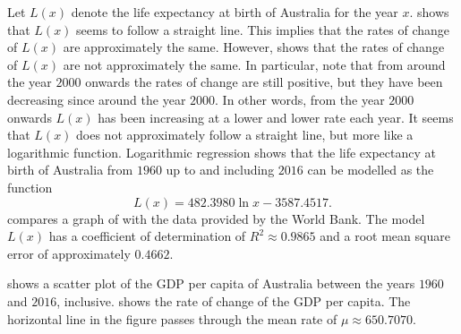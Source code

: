\documentclass[a4paper,oneside,12pt]{article}
\begin{document}
\begin{problem}
{\begin{solution}
Let $L(x)$ denote the life expectancy at birth of Australia for the
year $x$.   shows that
$L(x)$ seems to follow a straight line.  This implies that the rates
of change of $L(x)$ are approximately the same.  However,
 shows
that the rates of change of $L(x)$ are not approximately the same.  In
particular, note that from around the year $2000$ onwards the rates of
change are still positive, but they have been decreasing since around
the year $2000$.  In other words, from the year $2000$ onwards $L(x)$
has been increasing at a lower and lower rate each year.  It seems
that $L(x)$ does not approximately follow a straight line, but more
like a logarithmic function.  Logarithmic regression shows that the
life expectancy at birth of Australia from $1960$ up to and including
$2016$ can be modelled as the function
\begin{equation}
\label{eqn:logarithm:Australia_life_expectancy_formula}
L(x)
=
482.3980 \ln x - 3587.4517.
\end{equation}
 compares a graph of
 with the
data provided by the World Bank.  The model $L(x)$ has a coefficient
of determination of $R^2 \approx 0.9865$ and a root mean square error
of approximately $0.4662$.

 shows a
scatter plot of the GDP per capita of Australia between the years
$1960$ and $2016$, inclusive.
 shows the rate of
change of the GDP per capita.  The horizontal line in the figure
passes through the mean rate of $\mu \approx 650.7070$.


\end{solution}}
\end{problem}
\end{document}
